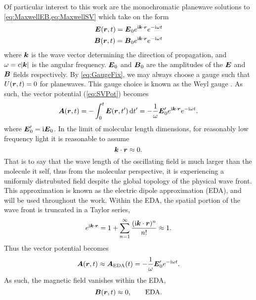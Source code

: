 Of particular interest to this work are the monochromatic planewave solutions to \cref{eq:MaxwellEB,eq:MaxwellSV}
which take on the form 
\begin{subequations}
\begin{align}
\boldsymbol{E}(\boldsymbol{r}, t) = \boldsymbol{E}_0 e^{\mathrm i\boldsymbol{k} \cdot \boldsymbol{r}} e^{-\mathrm i\omega t}\\
\boldsymbol{B}(\boldsymbol{r}, t) = \boldsymbol{B}_0 e^{\mathrm i\boldsymbol{k} \cdot \boldsymbol{r}} e^{-\mathrm i\omega t}
\end{align}
\end{subequations}
where $\boldsymbol{k}$ is the wave vector determining the direction of propagation, and $\omega = c\vert\boldsymbol{k}\vert$ is the
angular frequency. $\boldsymbol{E}_0$ and $\boldsymbol{B}_0$ are the amplitudes of the $\boldsymbol{E}$ and $\boldsymbol{B}$ fields respectively.
By \cref{eq:GaugeFix}, we may always choose a gauge such that $U(\boldsymbol{r},t) = 0$ for planewaves. 
This gauge choice is known as the Weyl gauge . As such, the vector potential (\cref{eq:SVPot}) becomes 
\begin{equation}
\boldsymbol{A}(\boldsymbol{r}, t) = -\int_0^t \boldsymbol{E}(\boldsymbol{r}, t') \,\mathrm{d} t' = -\frac{1}{\omega} \boldsymbol{E}'_0 e^{\mathrm i\boldsymbol{k} \cdot \boldsymbol{r}} e^{-\mathrm i\omega t}.
\end{equation}
where $\boldsymbol{E}'_0 = \mathrm i \boldsymbol{E}_0$. 
In the limit of molecular length dimensions, for reasonably low frequency light it is reasonable to assume
\begin{equation}
\boldsymbol{k} \cdot \boldsymbol{r} \approx 0.
\end{equation}
That is to say that the wave length of the oscillating field is much larger than the molecule it  self, thus
from the molecular perspective, it is experiencing a uniformly distrubuted field despite the global topology of
the physical wave front. This approximation is known as the electric dipole approximation (EDA), and will be used
throughout the work. Within the EDA, the spatial portion of the wave front is truncated in a Taylor series,
\begin{equation}
e^{\mathrm i\boldsymbol{k} \cdot \boldsymbol{r}} = 1 + \sum_{n=1}^\infty \frac{(\mathrm i \boldsymbol{k} \cdot \boldsymbol{r})^n}{n!} \approx 1.
\end{equation}
Thus the vector potential becomes
\begin{equation}
\label{eq:EDAV}
\boldsymbol{A}(\boldsymbol{r}, t) \approx \boldsymbol{A}_\mathrm{EDA}(t) = -\frac{1}{\omega} \boldsymbol{E}'_0 e^{-\mathrm i\omega t}.
\end{equation}
As such, the magnetic field vanishes within the EDA,
\begin{equation}
\boldsymbol{B}(\boldsymbol{r}, t) \approx 0, \qquad \text{EDA}.
\end{equation}


